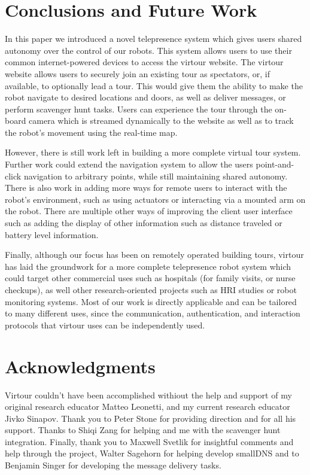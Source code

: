 \documentclass[
  oneside,
  11pt, a4paper,
  footinclude=true,
  headinclude=true,
  cleardoublepage=empty
]{article}
\begin{document}
\section{Conclusions and Future Work}

In this paper we introduced a novel telepresence system which gives users
shared autonomy over the control of our robots. This system allows users to use
their common internet-powered devices to access the virtour website. The
virtour website allows users to securely join an existing tour as spectators,
or, if available, to optionally lead a tour. This would give them the ability
to make the robot navigate to desired locations and doors, as well as deliver
messages, or perform scavenger hunt tasks. Users can experience the tour
through the on-board camera which is streamed dynamically to the website as
well as to track the robot's movement using the real-time map.

However, there is still work left in building a more complete virtual tour
system. Further work could extend the navigation system to allow the users
point-and-click navigation to arbitrary points, while still maintaining shared
autonomy. There is also work in adding more ways for remote users to interact
with the robot's environment, such as using actuators or interacting via a
mounted arm on the robot. There are multiple other ways of improving the client
user interface such as adding the display of other information such as distance
traveled or battery level information.

Finally, although our focus has been on remotely operated building tours,
virtour has laid the groundwork for a more complete telepresence robot system
which could target other commercial uses such as hospitals (for family visits,
or nurse checkups), as well other research-oriented projects such as HRI
studies or robot monitoring systems. Most of our work is directly applicable
and can be tailored to many different uses, since the communication,
authentication, and interaction protocols that virtour uses can be independently
used.

\section{Acknowledgments}

Virtour couldn't have been accomplished withiout the help and support of my
original research educator Matteo Leonetti, and my current research educator
Jivko Sinapov. Thank you to Peter Stone for providing direction and for all his
support. Thanks to Shiqi Zang for helping and me with the scavenger hunt
integration. Finally, thank you to Maxwell Svetlik for insightful comments and
help through the project, Walter Sagehorn for helping develop smallDNS and to
Benjamin Singer for developing the message delivery tasks.

\nocite{*}


    
\end{document}
